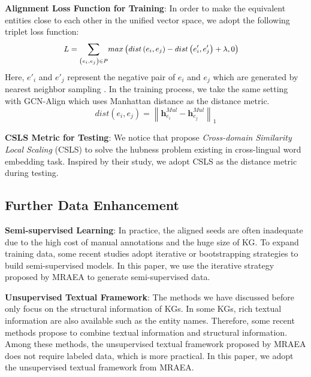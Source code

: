 \documentclass[sigconf,camera-ready]{acmart}
\begin{document}
\noindent
\textbf{Alignment Loss Function for Training}:
In order to make the equivalent entities close to each other in the unified vector space, we adopt the following triplet loss function:
\begin{equation}
\small
\begin{split}
L=\sum_{\substack{\left(e_i,e_j\right)\in P}}&{max}\left(dist\left(e_i,e_j\right)-dist\left(e'_i,e_j'\right)+\lambda,0\right)
\end{split}
\end{equation}
Here, $e'_i$ and $e'_j$ represent the negative pair of $e_i$ and $e_j$ which are generated by nearest neighbor sampling \cite{DBLP:conf/ijcai/SunHZQ18}.
In the training process, we take the same setting with GCN-Align \cite{DBLP:conf/emnlp/WangLLZ18} which uses Manhattan distance as the distance metric.
\begin{equation}
dist\left(e_i,e_j\right)=\left\| \bm{h}^{Mul}_{e_i}-\bm{h}^{Mul}_{e_j} \right\|_1
\end{equation}

\noindent
\textbf{CSLS Metric for Testing}:
We notice that \citet{DBLP:conf/iclr/LampleCRDJ18} propose \emph{Cross-domain Similarity Local Scaling} (CSLS) to solve the hubness problem existing in cross-lingual word embedding task.
Inspired by their study, we adopt CSLS as the distance metric during testing.


\subsection{Further Data Enhancement}

\noindent
\textbf{Semi-supervised Learning}:
In practice, the aligned seeds are often inadequate due to the high cost of manual annotations and the huge size of KG.
To expand training data, some recent studies \cite{DBLP:conf/ijcai/SunHZQ18,DBLP:conf/wsdm/MaoWXLW20} adopt iterative or bootstrapping strategies to build semi-supervised models.
In this paper, we use the iterative strategy proposed by MRAEA \cite{DBLP:conf/wsdm/MaoWXLW20} to generate semi-supervised data.

\noindent
\textbf{Unsupervised Textual Framework}:
The methods we have discussed before only focus on the structural information of KGs.
In some KGs, rich textual information are also available such as the entity names.
Therefore, some recent methods propose to combine textual information and structural information.
Among these methods, the unsupervised textual framework proposed by MRAEA \cite{DBLP:conf/wsdm/MaoWXLW20} does not require labeled data, which is more practical.
In this paper, we adopt the unsupervised textual framework from MRAEA.
\end{document}
